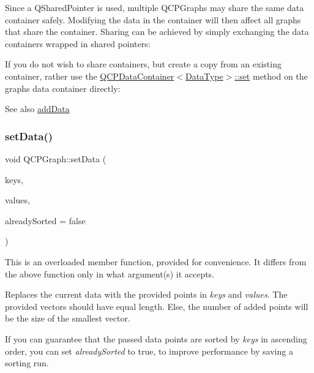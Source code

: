 Since a Q\+Shared\+Pointer is used, multiple Q\+C\+P\+Graphs may share the same data container safely. Modifying the data in the container will then affect all graphs that share the container. Sharing can be achieved by simply exchanging the data containers wrapped in shared pointers\+: 
\begin{DoxyCodeInclude}{0}
\end{DoxyCodeInclude}
 If you do not wish to share containers, but create a copy from an existing container, rather use the \mbox{\hyperlink{class_q_c_p_data_container_ae7042bd534fc3ce7befa2ce3f790b5bf}{Q\+C\+P\+Data\+Container$<$\+Data\+Type$>$\+::set}} method on the graph\textquotesingle{}s data container directly\+: 
\begin{DoxyCodeInclude}{0}
\end{DoxyCodeInclude}
 \begin{DoxySeeAlso}{See also}
\mbox{\hyperlink{class_q_c_p_graph_ae0555c0d3fe0fa7cb8628f88158d420f}{add\+Data}} 
\end{DoxySeeAlso}
\mbox{\label{class_q_c_p_graph_a73578d786532132310a926c3cd529b29}} 
\subsubsection{\texorpdfstring{setData()}{setData()}\hspace{0.1cm}{\footnotesize\ttfamily [2/2]}}
{\footnotesize\ttfamily void Q\+C\+P\+Graph\+::set\+Data (\begin{DoxyParamCaption}\item[{const Q\+Vector$<$ double $>$ \&}]{keys,  }\item[{const Q\+Vector$<$ double $>$ \&}]{values,  }\item[{bool}]{already\+Sorted = {\ttfamily false} }\end{DoxyParamCaption})}

This is an overloaded member function, provided for convenience. It differs from the above function only in what argument(s) it accepts.

Replaces the current data with the provided points in {\itshape keys} and {\itshape values}. The provided vectors should have equal length. Else, the number of added points will be the size of the smallest vector.

If you can guarantee that the passed data points are sorted by {\itshape keys} in ascending order, you can set {\itshape already\+Sorted} to true, to improve performance by saving a sorting run.


